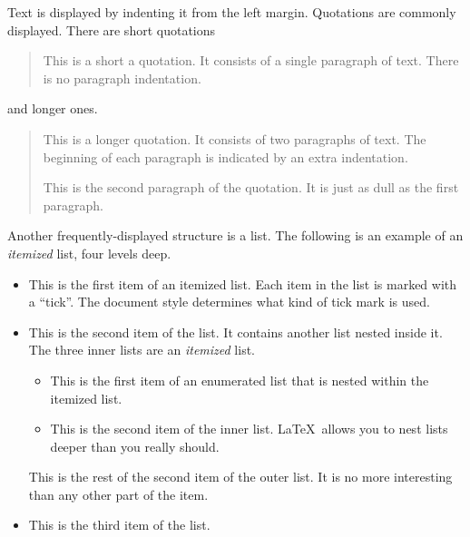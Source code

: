 \documentclass[ss]{imsart}
\numberwithin{equation}{section}
\theoremstyle{plain}
\begin{document}
Text is displayed by indenting it from the left margin.
Quotations are commonly displayed.  There are short quotations
\begin{quote}
   This is a short a quotation.  It consists of a
   single paragraph of text.  There is no paragraph
   indentation.
\end{quote}
and longer ones.
\begin{quotation}
   This is a longer quotation.  It consists of two paragraphs
   of text.  The beginning of each paragraph is indicated
   by an extra indentation.

   This is the second paragraph of the quotation.  It is just
   as dull as the first paragraph.
\end{quotation}
Another frequently-displayed structure is a list.
The following is an example of an {\em itemized} list, four levels deep.
\begin{itemize}
\item  This is the first item of an itemized list.  Each item
      in the list is marked with a ``tick''.  The document
      style determines what kind of tick mark is used.
\item  This is the second item of the list.  It contains another
      list nested inside it.  The three inner lists are an {\em itemized}
      list.
    \begin{itemize}
       \item This is the first item of an enumerated list that
            is nested within the itemized list.
          \item This is the second item of the inner list.  \LaTeX\
            allows you to nest lists deeper than you really should.
      \end{itemize}
      This is the rest of the second item of the outer list.  It
      is no more interesting than any other part of the item.
   \item  This is the third item of the list.
\end{itemize}
\end{document}
